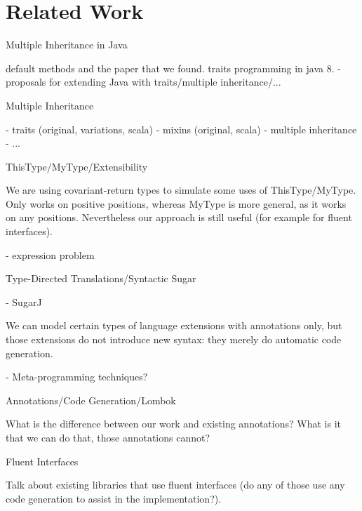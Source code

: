 \section{Related Work}\label{sec:related}

Multiple Inheritance in Java

default methods and the paper that we found. 
traits programming in java 8.
- proposals for extending Java with traits/multiple inheritance/...

Multiple Inheritance

- traits (original, variations, scala)
- mixins (original, scala)
- multiple inheritance
- ...

ThisType/MyType/Extensibility

We are using covariant-return types to simulate some uses 
of ThisType/MyType. Only works on positive positions, whereas 
MyType is more general, as it works on any positions. Nevertheless 
our approach is still useful (for example for fluent interfaces). 

- expression problem


Type-Directed Translations/Syntactic Sugar

- SugarJ

We can model certain types of language extensions with annotations 
only, but those extensions do not introduce new syntax: they 
merely do automatic code generation. 

- Meta-programming techniques? 

Annotations/Code Generation/Lombok

What is the difference between our work and existing annotations? 
What is it that we can do that, those annotations cannot?

Fluent Interfaces

Talk about existing libraries that use fluent interfaces (do any of 
those use any code generation to assist in the implementation?). 


